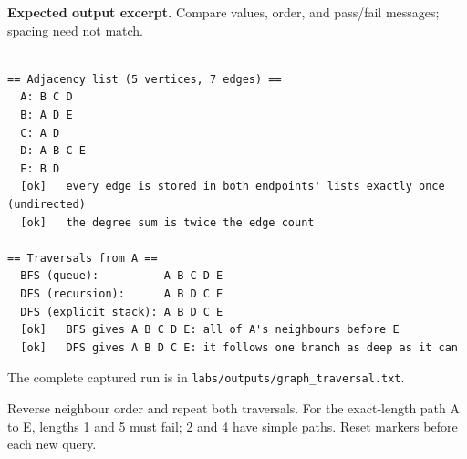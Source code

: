 \textbf{Expected output excerpt.} Compare values, order, and pass/fail messages; spacing need not match.

\begin{lstlisting}[style=utpterminal,language={}]

== Adjacency list (5 vertices, 7 edges) ==
  A: B C D 
  B: A D E 
  C: A D 
  D: A B C E 
  E: B D 
  [ok]   every edge is stored in both endpoints' lists exactly once (undirected)
  [ok]   the degree sum is twice the edge count

== Traversals from A ==
  BFS (queue):          A B C D E 
  DFS (recursion):      A B D C E 
  DFS (explicit stack): A B D C E 
  [ok]   BFS gives A B C D E: all of A's neighbours before E
  [ok]   DFS gives A B D C E: it follows one branch as deep as it can

\end{lstlisting}

The complete captured run is in \texttt{labs/outputs/graph\_traversal.txt}.

\begin{tryit}

Reverse neighbour order and repeat both traversals. For the exact-length path A to E, lengths 1 and 5 must fail; 2 and 4 have simple paths. Reset markers before each new query.

\end{tryit}
